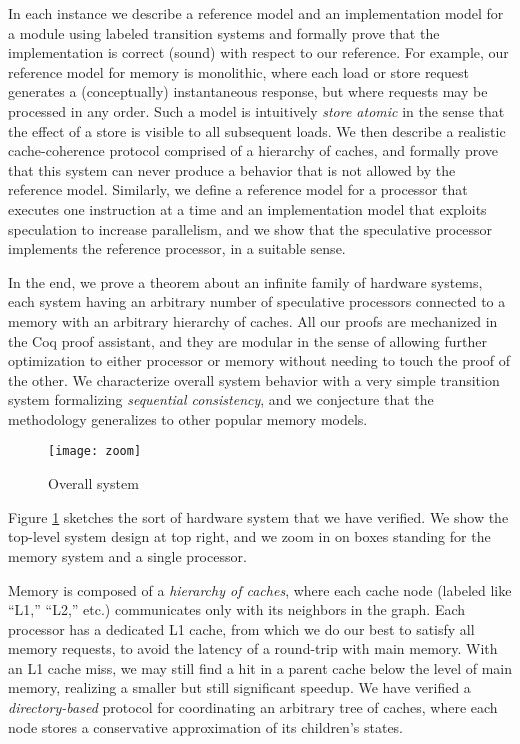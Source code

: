 In each instance we describe a reference model and an implementation model for
a module using labeled transition systems and formally prove that the
implementation is correct (sound) with respect to our reference. For example,
our reference model for memory is monolithic, where each load or store request
generates a (conceptually) instantaneous response, but where requests may be processed
in any order. Such a model is intuitively \emph{store atomic} in the sense that
the effect of a store is visible to all subsequent loads. We then describe a
realistic cache-coherence protocol comprised of a hierarchy of caches, and
formally prove that this system can never produce
a behavior that is not allowed by the reference model. Similarly, we define a
reference model for a processor that executes one instruction at a time and
an implementation model that exploits speculation to increase parallelism,
and we show that the speculative processor implements the reference processor,
in a suitable sense.

In the end, we prove a theorem about an infinite family of hardware systems,
each system having an arbitrary number of speculative processors connected to
a memory with an arbitrary hierarchy of caches.  All our proofs are mechanized
in the Coq proof assistant, and they are modular in the sense of allowing
further optimization to either processor or memory without needing to touch
the proof of the other.  We characterize overall system behavior with a very
simple transition system formalizing \emph{sequential consistency}, and we
conjecture that the methodology generalizes to other popular memory models.

\begin{figure}
\centering
\texttt{[image: zoom]}
\caption{Overall system}
\label{zoom}
\end{figure}

Figure \ref{zoom} sketches the sort of hardware system that we have verified.
We show the top-level system design at top right, and we zoom in on boxes standing for the
memory system and a single processor.

Memory is composed of a \emph{hierarchy of caches}, where each cache node (labeled
like ``L1,'' ``L2,'' etc.) communicates only with its neighbors in the graph.
Each processor has a dedicated L1 cache, from which we do our best to satisfy
all memory requests, to avoid the latency of a round-trip with main memory.
With an L1 cache miss, we may still find a hit in a parent cache below the
level of main memory, realizing a smaller but still significant speedup.
We have verified a \emph{directory-based} protocol for coordinating an arbitrary
tree of caches, where each node stores a conservative approximation of its
children's states.

